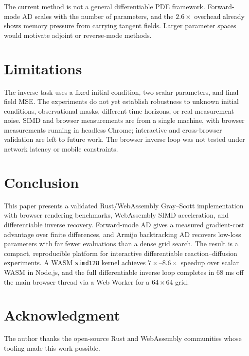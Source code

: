 \documentclass[journal]{IEEEtran}
\begin{document}
The current method is not a general differentiable PDE framework. Forward-mode
AD scales with the number of parameters, and the \(2.6\times\) overhead already
shows memory pressure from carrying tangent fields. Larger parameter spaces
would motivate adjoint or reverse-mode methods.

\section{Limitations}
The inverse task uses a fixed initial condition, two scalar parameters, and final
field MSE. The experiments do not yet establish robustness to unknown initial
conditions, observational masks, different time horizons, or real measurement
noise. SIMD and browser measurements are from a single machine, with browser
measurements running in headless Chrome; interactive and cross-browser
validation are left to future work. The browser inverse loop was not tested
under network latency or mobile constraints.

\section{Conclusion}
This paper presents a validated Rust/WebAssembly Gray--Scott implementation with
browser rendering benchmarks, WebAssembly SIMD acceleration, and differentiable
inverse recovery. Forward-mode AD gives a measured gradient-cost advantage over
finite differences, and Armijo backtracking AD recovers low-loss parameters with
far fewer evaluations than a dense grid search. The result is a compact,
reproducible platform for interactive differentiable reaction--diffusion
experiments.
A WASM \texttt{simd128} kernel achieves \(7\times\)--\(8.6\times\) speedup over
scalar WASM in Node.js, and the full differentiable inverse loop completes in
68 ms off the main browser thread via a Web Worker for a \(64\times64\) grid.

\section*{Acknowledgment}
The author thanks the open-source Rust and WebAssembly communities whose tooling
made this work possible.

\ifCLASSOPTIONcaptionsoff
  \newpage
\fi



\end{document}
